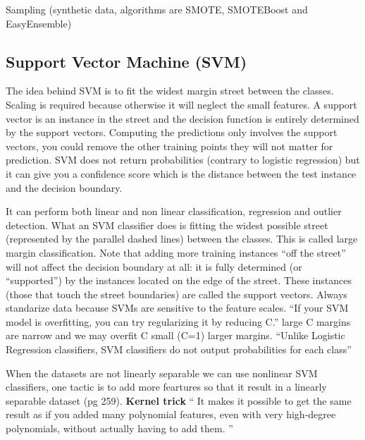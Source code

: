 \documentclass[12pt]{report}
\begin{document}
Sampling (synthetic data, algorithms are SMOTE, SMOTEBoost and EasyEnsemble)



\subsection{Support Vector Machine (SVM)}
%

The idea behind SVM is to fit the widest margin street between the classes. Scaling is required because otherwise it will neglect the small features.
A support vector is an instance in the street and the decision function is entirely determined by the support vectors. Computing the predictions only involves the support vectors, you could remove the other training points they will not matter for prediction.
SVM does not return probabilities (contrary to logistic regression) but it can give you a confidence score which is the distance between the test instance and the decision boundary.



It can perform both linear and non linear classification, regression and outlier detection. What an SVM classifier does is fitting the widest possible street (represented by the parallel dashed lines) between the classes. This is called large margin classification.
Note that adding more training instances “off the street” will not affect the decision boundary at all: it is fully determined (or “supported”) by the instances located on the edge of the street. These instances (those that touch the street boundaries) are called the support vectors. Always standarize data because SVMs are sensitive to the feature scales.
“If your SVM model is overfitting, you can try regularizing it by reducing C.” large C margins are narrow and we may overfit C small (C=1) larger margins. “Unlike Logistic Regression classifiers, SVM classifiers do not output probabilities for each class”


When the datasets are not linearly separable we can use nonlinear SVM classifiers, one tactic is to add more feartures so that it result in a linearly separable dataset (pg 259).
\textbf{Kernel trick} “ It makes it possible to get the same result as if you added many polynomial features, even with very high-degree polynomials, without actually having to add them. ”
\end{document}
